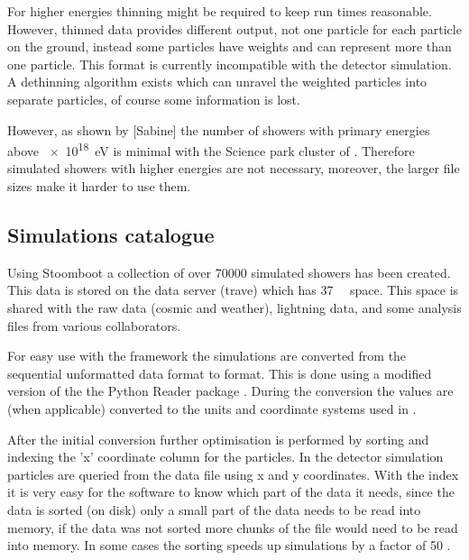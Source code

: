 For higher energies thinning might be required to keep run times
reasonable. However, thinned data provides different output, not one
particle for each particle on the ground, instead some particles have
weights and can represent more than one particle. This format is
currently incompatible with the detector simulation. A dethinning
algorithm exists \cite{stokes2012} which can unravel the weighted
particles into separate particles, of course some information is lost.

However, as shown by [Sabine] the number of showers with primary
energies above \SI{e18}{\eV} is minimal with the Science park
cluster of \hisparc. Therefore simulated showers with higher energies
are not necessary, moreover, the larger file sizes make it harder to
use them.


\subsection{Simulations catalogue}

Using Stoomboot a collection of over \num{70000} simulated showers has
been created. This data is stored on the \hisparc data server (trave)
which has \SI{37}{\tera\byte} space. This space is shared with the raw
\hisparc data (cosmic and weather), \knmi lightning data, and some
analysis files from various \hisparc collaborators.

For easy use with the \sapphire framework the \corsika simulations are
converted from the sequential unformatted \fortran data format to \hdf
format. This is done using a modified version of the the Python \corsika
Reader package \cite{gonzalez2011}. During the conversion the values are
(when applicable) converted to the units and coordinate systems used in
.

After the initial conversion further optimisation is performed by
sorting and indexing the 'x' coordinate column for the particles. In the
detector simulation particles are queried from the \corsika data file
using x and y coordinates. With the index it is very easy for the
software to know which part of the data it needs, since the data is
sorted (on disk) only a small part of the data needs to be read into
memory, if the data was not sorted more chunks of the file would need to
be read into memory. In some cases the sorting speeds up simulations by
a factor of 50 \cite{pytables:optimization}.


